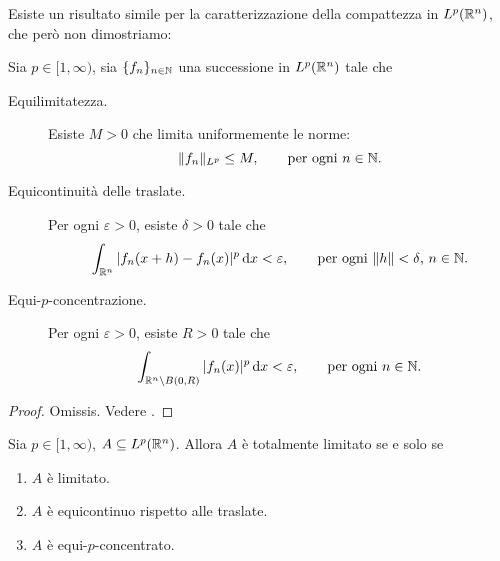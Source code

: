 Esiste un risultato simile per la caratterizzazione della compattezza in $L^p(\mathbb{R}^n)$, che però non dimostriamo:

\begin{theorem}
	Sia $p \in [1,\infty)$, sia $\{f_n\}_{n \in \mathbb{N}}$ una successione in $L^p(\mathbb{R}^n)$ tale che
	\begin{description}
		\item[Equilimitatezza.] Esiste $M>0$ che limita uniformemente le norme:
		\begin{equation*}
			\|f_n\|_{L^p} \leq M, \qquad \text{per ogni $n \in \mathbb{N}$}.
		\end{equation*}
		\item[Equicontinuità delle traslate.] Per ogni $\varepsilon > 0$, esiste $\delta > 0$ tale che
		\begin{equation*}
			\int_{\mathbb{R}^n} |f_n(x+h) - f_n(x)|^p \,\mathrm{d} x < \varepsilon, \qquad \text{per ogni $\|h\| < \delta$, $n \in \mathbb{N}$}.
		\end{equation*}
		\item[Equi-$p$-concentrazione.] Per ogni $\varepsilon > 0$, esiste $R > 0$ tale che
		\begin{equation*}
			\int_{\mathbb{R}^n \setminus B(0,R)} |f_n(x)|^p\,\mathrm{d} x < \varepsilon, \qquad \text{per ogni $n \in \mathbb{N}$}.
		\end{equation*}
	\end{description}
\end{theorem}
\begin{proof}
	Omissis. Vedere \cite{brezis2010functional}.
\end{proof}

\begin{corollary}
	Sia $p \in [1,\infty)$, $A \subseteq L^p(\mathbb{R}^n)$.
	Allora $A$ è totalmente limitato se e solo se
	\begin{enumerate}
		\item $A$ è limitato.
		\item $A$ è equicontinuo rispetto alle traslate.
		\item $A$ è equi-$p$-concentrato.
	\end{enumerate}
\end{corollary}
